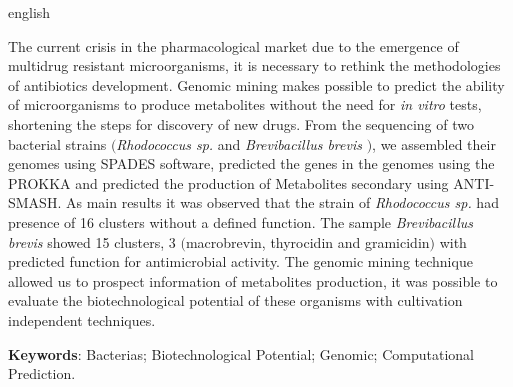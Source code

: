 \begin{resumo}[Abstract]
 \begin{otherlanguage*}{english}

   The current crisis in the pharmacological market due to the emergence of
   multidrug resistant microorganisms, it is necessary to rethink the methodologies of antibiotics development.
   Genomic mining makes possible to predict the ability of microorganisms to produce
   metabolites without the need for \textit{in vitro} tests, shortening the steps
   for discovery of new drugs. From the sequencing of two
   bacterial strains $($\textit{Rhodococcus sp.} and \textit{Brevibacillus brevis} $)$, we
   assembled their genomes using SPADES software, predicted the genes in the
   genomes using the PROKKA and predicted the production of Metabolites
   secondary using ANTI-SMASH. As main results it was observed that the strain
   of \textit{Rhodococcus sp.} had presence of 16 clusters without a defined function.
   The sample \textit{Brevibacillus brevis} showed 15 clusters, 3 $($macrobrevin, thyrocidin and gramicidin$)$ with predicted function
   for antimicrobial activity. The genomic mining technique allowed us to prospect information
   of metabolites production, it was possible to evaluate the biotechnological potential
   of these organisms with cultivation  independent techniques.

   \vspace{\onelineskip}
   \noindent 
   \textbf{Keywords}: Bacterias; Biotechnological Potential; Genomic; Computational Prediction.
 \end{otherlanguage*}
\end{resumo}

% 

%  
